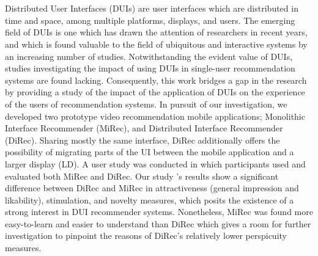 \chapter{\abstractname}
Distributed User Interfaces (DUIs) are user
interfaces which are distributed in time and space, among multiple platforms, displays, and
users. The emerging field of DUIs is one which has drawn the attention of
researchers in recent years, and which is found valuable to the field of ubiquitous and
interactive systems by an increasing number of studies. Notwithstanding the
evident value of DUIs, studies investigating the impact of using DUIs in
single-user recommendation systems are found lacking. Consequently, this work
bridges a gap in the research by providing a study of the impact of the application of DUIs on the experience of the users of
recommendation systems. In pursuit of our investigation, we developed two
prototype video recommendation mobile applications; Monolithic Interface
Recommender (MiRec), and Distributed Interface Recommender (DiRec). Sharing
mostly the same interface, DiRec additionally offers
the possibility of migrating parts of the UI between the mobile application and
a larger display (LD).
A user study was conducted in which participants used and evaluated both MiRec
and DiRec. Our study 's results
show a significant difference between DiRec and MiRec in attractiveness (general
impression and likability), stimulation, and novelty measures, which posits the
existence of a strong interest in DUI recommender systems. Nonetheless, MiRec
was found more easy-to-learn and easier to understand than DiRec
which gives a room for further investigation to pinpoint the reasons of DiRec's
relatively lower perspicuity measures.


